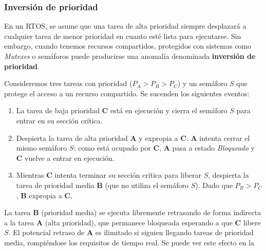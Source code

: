 \documentclass[../main.tex]{subfiles}
\begin{document}
        \subsubsection{Inversión de prioridad}

            En un RTOS, se asume que una tarea de alta prioridad siempre desplazará a cualquier tarea de menor prioridad en cuanto esté lista para ejecutarse. Sin embargo, cuando tenemos recursos compartidos, protegidos con sistemas como \emph{Mutexes} o semáforos puede producirse una anomalía denominada \textbf{inversión de prioridad}.

            Consideremos tres tareas con prioridad ($P_A > P_B > P_C$) y un semáforo $S$ que protege el acceso a un recurso compartido. Se sucenden los siguientes eventos:

            \begin{enumerate}
                \item La tarea de baja prioridad \textbf{C} está en ejecución y cierra el semáforo $S$ para entrar en su sección crítica.
                \item Despierta la tarea de alta prioridad \textbf{A} y expropia a \textbf{C}. \textbf{A} intenta cerrar el mismo semáforo $S$; como está ocupado por \textbf{C}, \textbf{A} pasa a estado \textit{Bloqueado} y \textbf{C} vuelve a entrar en ejecución.
                \item Mientras \textbf{C} intenta terminar su sección crítica para liberar $S$, despierta la tarea de prioridad media \textbf{B} (que no utiliza el semáforo $S$). Dado que $P_B > P_C$, \textbf{B} expropia a \textbf{C}.
            \end{enumerate}

            La tarea \textbf{B} (prioridad media) se ejecuta libremente retrasando de forma indirecta a la tarea \textbf{A} (alta prioridad), que permanece bloqueada esperando a que \textbf{C} libere $S$. El potencial retraso de \textbf{A} es ilimitado si siguien llegando tareas de prioridad media, rompiéndose los requisitos de tiempo real. Se puede ver este efecto en la 

\end{document}
